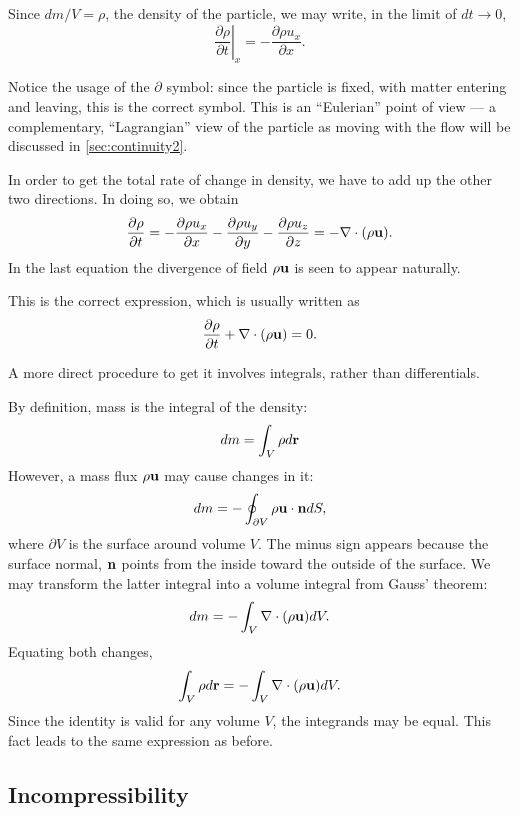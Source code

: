 Since $dm/V=\rho$, the density of the particle, we may write, in the
limit of $dt\to 0$,
\[
\left. \frac{\partial \rho}{\partial t} \right|_x =
-\frac{\partial  \rho  u_x}{\partial x} .
\]

Notice the usage of the $\partial$ symbol: since the particle is
fixed, with matter entering and leaving, this is the correct
symbol. This is an ``Eulerian'' point of view --- a complementary,
``Lagrangian'' view of the particle as moving with the flow will be
discussed in \ref{sec:continuity2}.

In order to get the total rate of change in density, we have to
add up the other two directions. In doing so, we obtain
\begin{equation}
  \label{eq:continuity0}
  \frac{\partial \rho}{\partial t} =
  -\frac{\partial  \rho  u_x}{\partial x}
    -\frac{\partial  \rho  u_y}{\partial y}
    -\frac{\partial  \rho  u_z}{\partial z}  =
    -\nabla\cdot ( \rho  \mathbf{u}) .
\end{equation}
In the last equation the divergence of field $ \rho \mathbf{u}$ is
seen to appear naturally.

This is the correct expression, which is usually written as
\begin{equation}
  \label{eq:continuity}
  \frac{\partial \rho }{\partial t} +  \nabla \cdot (\rho \mathbf{u} ) = 0 .
\end{equation}


A more direct procedure to get it involves integrals, rather
than differentials.

By definition, mass is the integral of the density:
\[
d m = \int_V \rho d\mathbf{r}
\]
However, a mass flux $\rho\mathbf{u}$ may cause changes in it:
\[
d m = - \oint_{\partial V} \rho \mathbf{u} \cdot \mathbf{n} dS ,
\]
where $\partial V$ is the surface around volume $V$. The minus sign
appears because the surface normal, $\mathbf{n}$ points from the inside
toward the outside of the surface. We may transform the latter
integral into a volume integral from Gauss' theorem:
\[
d m = - \int_V \nabla\cdot (\rho \mathbf{u} ) dV .
\]
Equating both changes,
\[
\int_V \rho d\mathbf{r} = - \int_V \nabla\cdot (\rho \mathbf{u} ) dV .
\]
Since the identity is valid for any volume $V$, the integrands may
be equal. This fact leads to the same expression as before.


\subsection{Incompressibility}
\label{sec:incompressibility}

